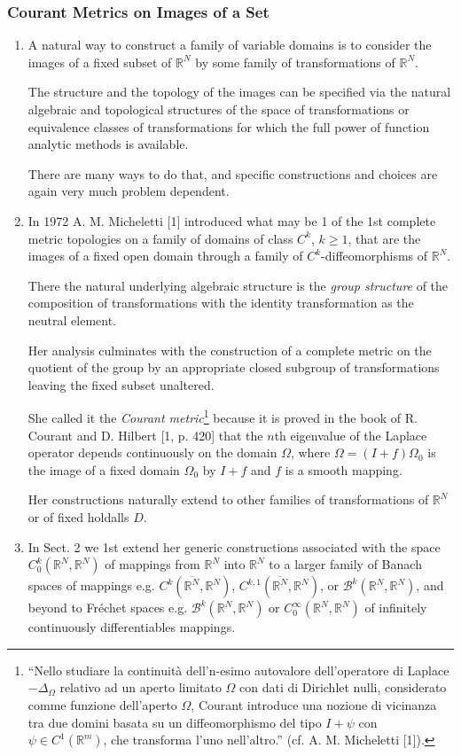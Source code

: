 \documentclass{book}
\numberwithin{equation}{section}
\begin{document}
\subsubsection{Courant Metrics on Images of a Set}
\begin{enumerate}
    \item A natural way to construct a family of variable domains is to consider the images of a fixed subset of $\mathbb{R}^N$ by some family of transformations of $\mathbb{R}^N$.
    
    The structure and the topology of the images can be specified via the natural algebraic and topological structures of the space of transformations or equivalence classes of transformations for which the full power of function analytic methods is available.
    
    There are many ways to do that, and specific constructions and choices are again very much problem dependent.
    \item In 1972 A. M. Micheletti [1] introduced what may be 1 of the 1st complete metric topologies on a family of domains of class $C^k$, $k\ge 1$, that are the images of a fixed open domain through a family of $C^k$-diffeomorphisms of $\mathbb{R}^N$.
    
    There the natural underlying algebraic structure is the \textit{group structure} of the composition of transformations with the identity transformation as the neutral element.
    
    Her analysis culminates with the construction of a complete metric on the quotient of the group by an appropriate closed subgroup of transformations leaving the fixed subset unaltered.
    
    She called it the \textit{Courant metric}\footnote{``Nello studiare la continuità dell'n-esimo autovalore dell'operatore di Laplace $-\Delta_\Omega$ relativo ad un aperto limitato $\Omega$ con dati di Dirichlet nulli, considerato comme funzione dell'aperto $\Omega$, Courant introduce una nozione di vicinanza tra due domini basata su un diffeomorphismo del tipo $I + \psi$ con $\psi\in C^1\left(\mathbb{R}^m\right)$, che transforma l'uno nell'altro.'' (cf. A. M. Micheletti [1]).} because it is proved in the book of R. Courant and D. Hilbert [1, p. 420] that the $n$th eigenvalue of the Laplace operator depends continuously on the domain $\Omega$, where $\Omega = (I + f)\Omega_0$ is the image of a fixed domain $\Omega_0$ by $I + f$ and $f$ is a smooth mapping.
    
    Her constructions naturally extend to other families of transformations of $\mathbb{R}^N$ or of fixed holdalls $D$.
    \item In Sect. 2 we 1st extend her generic constructions associated with the space $C_0^k(\mathbb{R}^N,\mathbb{R}^N)$ of mappings from $\mathbb{R}^N$ into $\mathbb{R}^N$ to a larger family of Banach spaces of mappings e.g. $C^k(\overline{\mathbb{R}^N},\mathbb{R}^N)$, $C^{k,1}(\overline{\mathbb{R}^N},\mathbb{R}^N)$, or $\mathcal{B}^k(\mathbb{R}^N,\mathbb{R}^N)$, and beyond to Fr\'echet spaces e.g. $\mathcal{B}^k(\mathbb{R}^N,\mathbb{R}^N)$ or $C_0^\infty(\mathbb{R}^N,\mathbb{R}^N)$ of infinitely continuously differentiables mappings.
    

\end{enumerate}
\end{document}
